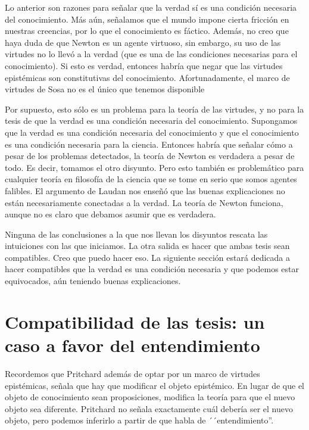 \documentclass{article}
\begin{document}
Lo anterior son razones para señalar que la verdad sí es una condición necesaria del conocimiento. Más aún, señalamos que el mundo impone cierta fricción en nuestras creencias, por lo que el conocimiento es fáctico. Además, no creo que haya duda de que Newton es un agente virtuoso, sin embargo, su uso de las virtudes no lo llevó a la verdad (que es una de las condiciones necesarias para el conocimiento). Si esto es verdad, entonces habría que negar que las virtudes epistémicas son constitutivas del conocimiento. Afortunadamente, el marco de virtudes de Sosa no es el único que tenemos disponible

Por supuesto, esto sólo es un problema para la teoría de las virtudes, y no para la tesis de que la verdad es una condición necesaria del conocimiento. Supongamos que la verdad es una condición necesaria del conocimiento y que el conocimiento es una condición necesaria para la ciencia. Entonces habría que señalar cómo a pesar de los problemas detectados, la teoría de Newton es verdadera a pesar de todo. Es decir, tomamos el otro disyunto. Pero esto también es problemático para cualquier teoría en filosofía de la ciencia que se tome en serio que somos agentes falibles. El argumento de Laudan \citeyear{Laudan1981} nos enseñó que las buenas explicaciones no están necesariamente conectadas a la verdad. La teoría de Newton funciona, aunque no es claro que debamos asumir que es verdadera.

Ninguna de las conclusiones a la que nos llevan los disyuntos rescata las intuiciones con las que iniciamos. La otra salida es hacer que ambas tesis sean compatibles. Creo que puedo hacer eso. La siguiente sección estará dedicada a hacer compatibles que la verdad es una condición necesaria y que podemos estar equivocados, aún teniendo buenas explicaciones.

\section{Compatibilidad de las tesis: un caso a favor del entendimiento}

\noindent Recordemos que Pritchard además de optar por un marco de virtudes epistémicas, señala que hay que modificar el objeto epistémico. En lugar de que el objeto de conocimiento sean proposiciones, modifica la teoría para que el nuevo objeto sea diferente. Pritchard no señala exactamente cuál debería ser el nuevo objeto, pero podemos inferirlo a partir de que habla de ´´entendimiento''. 
\end{document}
